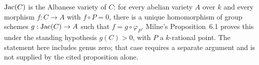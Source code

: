 \begin{theorem}
  \label{pa-thm:exists_unique_ofCurve_comp}


  \(\mathrm{Jac}(C)\) is the Albanese variety of \(C\): for every abelian variety \(A\) over \(k\) and every
  morphism \(f : C \to A\) with \(f \circ P = 0\), there is a unique homomorphism of group schemes
  \(g : \mathrm{Jac}(C) \to A\) such that \(f = g \circ \varphi_P\).  Milne's Proposition~6.1
  proves this under the standing hypothesis \(g(C)>0\), with \(P\) a \(k\)-rational point.
  The statement here includes genus zero; that case requires a separate argument and is not
  supplied by the cited proposition alone.
\end{theorem}
